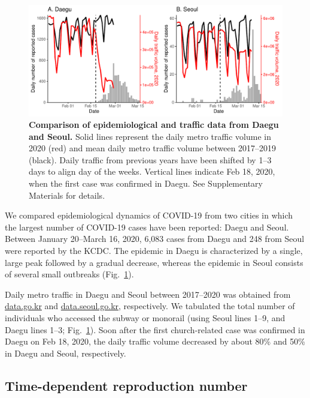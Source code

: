 \documentclass[12pt]{article}
\newcommand{\fref}[1]{Fig.~\ref{fig:#1}}
\begin{document}
\begin{figure}[!h]
\includegraphics[width=\textwidth]{figure_compare_report.pdf}
\caption{
\textbf{Comparison of epidemiological and traffic data from Daegu and Seoul.}
Solid lines represent the daily metro traffic volume in 2020 (red) and mean daily metro traffic volume between 2017--2019 (black).
Daily traffic from previous years have been shifted by 1--3 days to align day of the weeks.
Vertical lines indicate Feb 18, 2020, when the first case was confirmed in Daegu.
See Supplementary Materials for details.
}
\label{fig:data}
\end{figure}

We compared epidemiological dynamics of COVID-19 from two cities in which the largest number of COVID-19 cases have been reported: Daegu and Seoul.
Between January 20--March 16, 2020, 6,083 cases from Daegu and 248 from Seoul were reported by the KCDC.
The epidemic in Daegu is characterized by a single, large peak followed by a gradual decrease, whereas the epidemic in Seoul consists of several small outbreaks (\fref{data}).

Daily metro traffic in Daegu and Seoul between 2017--2020 was obtained from \url{data.go.kr} and \url{data.seoul.go.kr}, respectively.
We tabulated the total number of individuals who accessed the subway or monorail (using Seoul lines 1--9, and Daegu lines 1--3; \fref{data}).
Soon after the first church-related case was confirmed in Daegu on Feb 18, 2020, the daily traffic volume decreased by about 80\% and 50\% in Daegu and Seoul, respectively.


\subsection{Time-dependent reproduction number}
\end{document}
